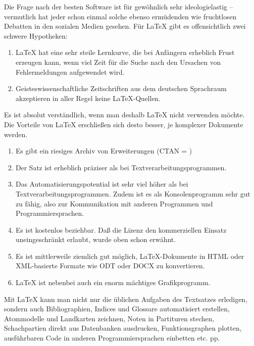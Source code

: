 \documentclass[
	11pt,        %
	table,       %
	twoside,     %
	notitlepage, %
]{scrreprt}
\begin{document}
Die Frage nach der besten Software ist für gewöhnlich sehr ideologielastig -- vermutlich hat jeder schon  einmal solche ebenso ermüdenden wie fruchtlosen Debatten in den sozialen Medien gesehen. Für \LaTeX{} gibt es offensichtlich zwei schwere Hypotheken:
\begin{enumerate}
\item \LaTeX{} hat eine sehr steile Lernkurve, die bei Anfängern erheblich Frust erzeugen kann, wenn viel Zeit für die Suche nach den Ursachen von Fehlermeldungen aufgewendet wird.
\item Geisteswissenschaftliche Zeitschriften aus dem deutschen Sprachraum akzeptieren in aller Regel keine \LaTeX-Quellen.
\end{enumerate}
Es ist absolut verständlich, wenn man deshalb \LaTeX{} nicht verwenden möchte. Die Vorteile von \LaTeX{} erschließen sich desto besser, je komplexer Dokumente werden.
\begin{enumerate}
\item Es gibt ein riesiges Archiv von Erweiterungen (CTAN = )
\item Der Satz ist erheblich präziser als bei Textverarbeitungsprogrammen.
\item Das Automatisierungspotential ist sehr viel höher als bei Textverarbeitungsprogrammen. Zudem ist es als Konsolenprogramm sehr gut zu  fähig, also zur Kommunikation mit anderen Programmen und Programmiersprachen.
\item Es ist kostenlos beziehbar. Daß die Lizenz den kommerziellen Einsatz uneingeschränkt erlaubt, wurde oben schon erwähnt.
\item Es ist mittlerweile ziemlich gut möglich, \LaTeX-Dokumente in HTML oder XML-basierte Formate wie ODT oder DOCX zu konvertieren.
\item \LaTeX{} ist nebenbei auch ein enorm mächtiges Grafikprogramm.
\end{enumerate}

Mit \LaTeX{} kann man nicht nur die üblichen Aufgaben des Textsatzes erledigen, sondern auch Bibliographien, Indices und Glossare automatisiert erstellen, Atommodelle und Landkarten zeichnen, Noten in Partituren stechen, Schachpartien direkt aus Datenbanken ausdrucken, Funktionsgraphen plotten, ausführbaren Code in anderen Programmiersprachen einbetten etc. pp.
\end{document}
